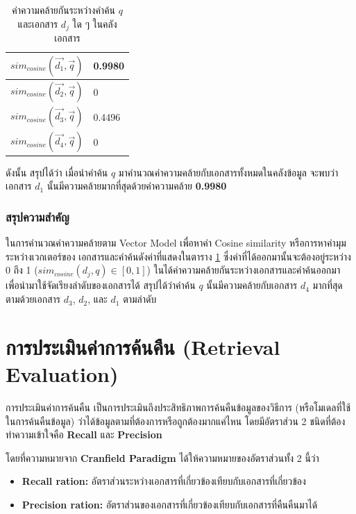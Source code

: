 \documentclass[11pt,a4paper]{article}
\begin{document}
{{{\begin{table}[ht!]
    \centering
    \caption{ค่าความคล้ายกันระหว่างคำค้น \emph{$q$} และเอกสาร \emph{$d_j$} ใด ๆ ในคลังเอกสาร}
    \label{tab:cosinesimcalculate}
    \begin{tabular}{|c|l|} 
        \hline
        $sim_{cosine}(\overrightarrow{d_1}, \overrightarrow{q})$   & 0.9980  \\
        \hline
        $sim_{cosine}(\overrightarrow{d_2}, \overrightarrow{q})$   & 0 \\
        \hline
        $sim_{cosine}(\overrightarrow{d_3}, \overrightarrow{q})$   & 0.4496 \\
        \hline
        $sim_{cosine}(\overrightarrow{d_4}, \overrightarrow{q})$   & 0 \\
        \hline
    \end{tabular}
\end{table}

ดังนั้น สรุปได้ว่า เมื่อนำคำค้น \emph{$q$} มาคำนวณค่าความคล้ายกับเอกสารทั้งหมดในคลังข้อมูล จะพบว่า 
เอกสาร \emph{$d_1$} นั้นมีความคล้ายมากที่สุดด้วยค่าความคล้าย {\bf 0.9980  } 

\subsubsection{สรุปความสำคัญ} 

ในการคำนวณค่าความคล้ายตาม Vector Model เพื่อหาค่า Cosine similarity หรือการหาค่ามุมระหว่างเวกเตอร์ของ
เอกสารและคำค้นดังค่าที่แสดงในตาราง \ref{tab:cosinesimcalculate} ซึ่งค่าที่ได้ออกมานั้นจะต้องอยู่ระหว่าง 0 ถึง 1 
($sim_{cosine}(d_j, q) \in [0, 1]$) ในได้ค่าความคล้ายกันระหว่างเอกสารและคำค้นออกมา 
เพื่อนำมาใช้จัดเรียงลำดับของเอกสารได้ สรุปได้ว่าคำค้น \emph{$q$} นั้นมีความคล้ายกับเอกสาร \emph{$d_4$} มากที่สุด 
ตามด้วยเอกสาร \emph{$d_3$}, \emph{$d_2$}, และ \emph{$d_1$} ตามลำดับ

\section{การประเมินค่าการค้นคืน (Retrieval Evaluation)}

การประเมินค่าการค้นคืน เป็นการประเมินถึงประสิทธิภาพการค้นคืนข้อมูลของวิธีการ (หรือโมเดลที่ใช้ในการค้นคืนข้อมูล) 
ว่าได้ข้อมูลตามที่ต้องการหรือถูกต้องมากแค่ไหน โดยมีอัตราส่วน 2 ชนิดที่ต้องทำความเข้าใจคือ {\bf Recall} และ {\bf Precision}

โดยที่ความหมายจาก {\bf Cranfield Paradigm} ได้ให้ความหมายของอัตราส่วนทั้ง 2 นี้ว่า

\begin{itemize}
    \item {\bf Recall ration:} อัตราส่วนระหว่างเอกสารที่เกี่ยวข้องเทียบกับเอกสารที่เกี่ยวข้อง
    \item {\bf Precision ration:} อัตราส่วนของเอกสารที่เกี่ยวข้องเทียบกับเอกสารที่คืนคืนมาได้
\end{itemize}

}}}
\end{document}
